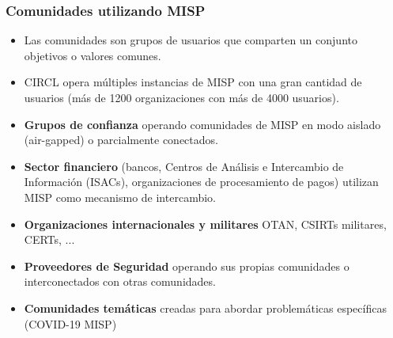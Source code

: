 \begin{frame}
 \frametitle{Comunidades utilizando MISP}
 \begin{itemize}
	 \item Las comunidades son grupos de usuarios que comparten un conjunto objetivos o valores comunes.
	 \item CIRCL opera múltiples instancias de MISP con una gran cantidad de usuarios (más de 1200 organizaciones con más de 4000 usuarios).
         \item {\bf Grupos de confianza} operando comunidades de MISP en modo aislado (air-gapped) o parcialmente conectados.
	 \item {\bf Sector financiero} (bancos, Centros de Análisis e Intercambio de Información (ISACs), organizaciones de procesamiento de pagos) utilizan MISP como mecanismo de intercambio.
	 \item {\bf Organizaciones internacionales y militares} OTAN, CSIRTs militares, CERTs, ...
	 \item {\bf Proveedores de Seguridad} operando sus propias comunidades o interconectados con otras comunidades.
         \item {\bf Comunidades temáticas} creadas para abordar problemáticas específicas (COVID-19 MISP) 
 \end{itemize}
\end{frame}


